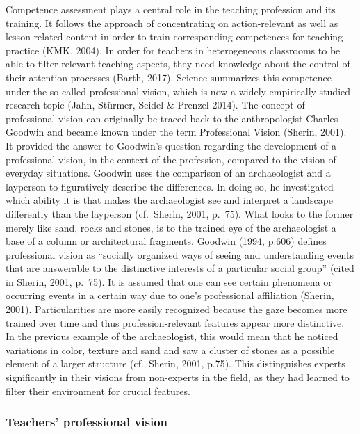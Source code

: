 \documentclass[
  man]{apa6}
\begin{document}
Competence assessment plays a central role in the teaching profession and its training. It follows the approach of concentrating on action-relevant as well as lesson-related content in order to train corresponding competences for teaching practice (KMK, 2004). In order for teachers in heterogeneous classrooms to be able to filter relevant teaching aspects, they need knowledge about the control of their attention processes (Barth, 2017). Science summarizes this competence under the so-called professional vision, which is now a widely empirically studied research topic (Jahn, Stürmer, Seidel \& Prenzel 2014). The concept of professional vision can originally be traced back to the anthropologist Charles Goodwin and became known under the term Professional Vision (Sherin, 2001). It provided the answer to Goodwin's question regarding the development of a professional vision, in the context of the profession, compared to the vision of everyday situations. Goodwin uses the comparison of an archaeologist and a layperson to figuratively describe the differences. In doing so, he investigated which ability it is that makes the archaeologist see and interpret a landscape differently than the layperson (cf.~Sherin, 2001, p.~75). What looks to the former merely like sand, rocks and stones, is to the trained eye of the archaeologist a base of a column or architectural fragments. Goodwin (1994, p.606) defines professional vision as ``socially organized ways of seeing and understanding events that are answerable to the distinctive interests of a particular social group'' (cited in Sherin, 2001, p.~75). It is assumed that one can see certain phenomena or occurring events in a certain way due to one's professional affiliation (Sherin, 2001). Particularities are more easily recognized because the gaze becomes more trained over time and thus profession-relevant features appear more distinctive. In the previous example of the archaeologist, this would mean that he noticed variations in color, texture and sand and saw a cluster of stones as a possible element of a larger structure (cf.~Sherin, 2001, p.75). This distinguishes experts significantly in their visions from non-experts in the field, as they had learned to filter their environment for crucial features.

\hypertarget{teachers-professional-vision}{%
\subsubsection{Teachers' professional vision}\label{teachers-professional-vision}}
\end{document}
